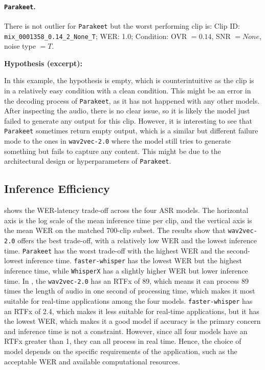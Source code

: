 \paragraph{\texttt{Parakeet}.} There is not outlier for \texttt{Parakeet} but the worst performing clip is:
Clip ID: \texttt{mix\_0001358\_0.14\_2\_None\_T}; WER: 1.0; Condition: OVR $=0.14$, SNR $=None$, noise type $=T$.
\begin{asrexample}
\footnotesize
\textbf{Hypothesis (excerpt):}
\end{asrexample}
In this example, the hypothesis is empty, which is counterintuitive as the clip is in a relatively easy condition with a clean condition. This might be an error in the decoding process of \texttt{Parakeet}, as it has not happened with any other models. After inspecting the audio, there is no clear issue, so it is likely the model just failed to generate any output for this clip. However, it is interesting to see that \texttt{Parakeet} sometimes return empty output, which is a similar but different failure mode to the ones in \texttt{wav2vec-2.0} where the model still tries to generate something but fails to capture any content. This might be due to the architectural design or hyperparameters of \texttt{Parakeet}.

\subsection{Inference Efficiency}
 shows the WER-latency trade-off across the four ASR models. The horizontal axis is the log scale of the mean inference time per clip, and the vertical axis is the mean WER on the matched 700-clip subset. The results show that \texttt{wav2vec-2.0} offers the best trade-off, with a relatively low WER and the lowest inference time. \texttt{Parakeet} has the worst trade-off with the highest WER and the second-lowest inference time. \texttt{faster-whisper} has the lowest WER but the highest inference time, while \texttt{WhisperX} has a slightly higher WER but lower inference time. In , the \texttt{wav2vec-2.0} has an RTFx of 89, which means it can process 89 times the length of audio in one second of processing time, which makes it most suitable for real-time applications among the four models. \texttt{faster-whisper} has an RTFx of 2.4, which makes it less suitable for real-time applications, but it has the lowest WER, which makes it a good model if accuracy is the primary concern and inference time is not a constraint. However, since all four models have an RTFx greater than 1, they can all process in real time. Hence, the choice of model depends on the specific requirements of the application, such as the acceptable WER and available computational resources.

